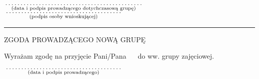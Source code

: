 \documentclass[a4paper,11pt]{article}
\newcommand{\fillField}[2]{
    $\underset{\text{#1}}{\parbox[t]{#2}{\dotfill}}$
}
\begin{document}
\vskip 0.6cm

\fillField{(data i podpis prowadzącego dotychczasową grupę)}{7cm} \hspace{\fill} \fillField{(podpis osoby wnioskującej)}{6cm}
\vskip 1.0cm

\noindent\rule{\textwidth}{0.5pt}

\begin{center}
ZGODA PROWADZĄCEGO NOWĄ GRUPĘ
\end{center}

\noindent
Wyrażam zgodę na przyjęcie Pani/Pana ~\dotfill~ do ww. grupy zajęciowej.

\vskip 1.5cm

\hspace{\fill} \fillField{(data i podpis prowadzącego)}{6cm} \hspace{2.0cm}



\end{document}
